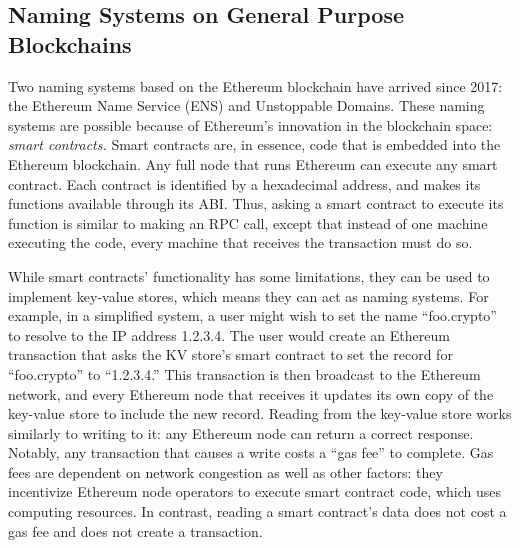 \subsection{Naming Systems on General Purpose Blockchains}

Two naming systems based on the Ethereum blockchain have 
arrived since 2017: the Ethereum Name 
Service (ENS) and Unstoppable Domains. These naming systems 
are possible because of Ethereum's innovation in the 
blockchain space: \emph{smart contracts.} Smart contracts 
are, in essence, code that is embedded into the Ethereum 
blockchain. Any full node that runs Ethereum can execute any 
smart contract. Each contract is identified by a hexadecimal 
address, and makes its functions available through its ABI. 
Thus, asking a smart contract to execute 
its function is similar to making an RPC call, except that 
instead of one machine executing the code, every machine that 
receives the transaction must do so. 

While smart contracts' functionality has some limitations, they can 
be used to implement key-value stores, which means they can act as naming 
systems. For example, in a simplified system, a user might wish to set the name 
``foo.crypto'' to resolve to the IP address 1.2.3.4. The user would create an 
Ethereum transaction that asks the KV store's smart contract 
to set the record for ``foo.crypto'' to ``1.2.3.4.'' 
This transaction is then broadcast to the Ethereum network, 
and every Ethereum 
node that receives it updates its own copy of the key-value store to include 
the new record. Reading from the key-value store works similarly to writing to 
it: any Ethereum node can return a correct response. 
Notably, any transaction that causes a write costs a ``gas 
fee'' to complete. Gas fees are dependent on network 
congestion as well as other factors: they incentivize 
Ethereum node operators to execute smart contract code, which 
uses computing resources. In contrast, reading a 
smart contract's data does not cost a gas fee and does not 
create a transaction.

